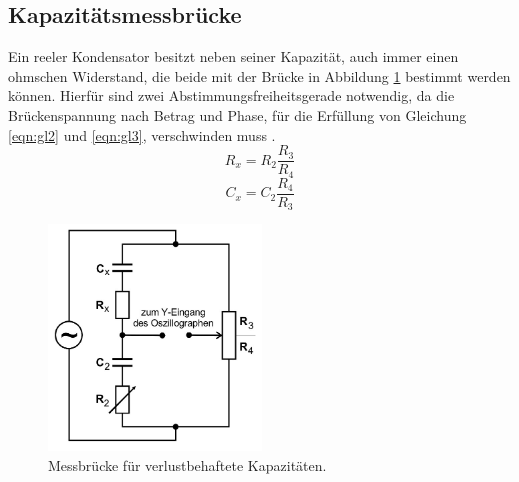 \subsection{Kapazitätsmessbrücke}
\label{sec:Theorie2}
Ein reeler Kondensator besitzt neben seiner Kapazität, auch immer einen ohmschen Widerstand, die beide mit der Brücke in Abbildung \ref{fig:Schaltung3} bestimmt werden können.
Hierfür sind zwei Abstimmungsfreiheitsgerade notwendig, da die Brückenspannung nach Betrag und Phase, für die Erfüllung von Gleichung \eqref{eqn:gl2} und \eqref{eqn:gl3}, verschwinden muss .
\begin{equation}
  R_x = R_2 \frac{R_3}{R_4}
  \label{eqn:gl5}
\end{equation}
\begin{equation}
  C_x = C_2 \frac{R_4}{R_3}
  \label{eqn:gl6}
\end{equation}
\begin{figure}
  \includegraphics[height=6cm]{data/Schaltung3.jpg}
  \centering
  \caption{Messbrücke für verlustbehaftete Kapazitäten.}
  \label{fig:Schaltung3}
\end{figure}
\FloatBarrier

